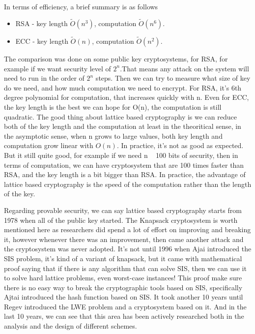 In terms of efficiency, a brief summary is as follows
\begin{itemize}
    \item RSA - key length $\tilde{O}(n^3)$, computation $\tilde{O}(n^6)$.
    \item ECC - key length $\tilde{O}(n)$, computation $\tilde{O}(n^2)$.

\end{itemize} The comparison was done on some public key cryptosystems, for RSA,
for example if we want security level of $2^n$.That means any attack on the
system will need to run in the order of $2^n$ steps.  Then we can try to measure
what size of key do we need, and how much computation we need to encrypt. For
RSA, it’s 6th degree polynomial for computation, that increases quickly with n.
Even for ECC, the key length is the best we can hope for O(n), the computation
is still quadratic.  The good thing about lattice based cryptography is we can
reduce both of the key length and the computation at least in the theoritical
sense, in the asymptotic sense, when n grows to large values, both key length
and computation grow linear with $O(n)$. In practice, it’s not as good as
expected.  But it still quite good, for example if we need n ~ 100 bits of
security, then in terms of computation, we can have cryptosystem that are 100
times faster than RSA, and  the key length is a bit bigger than RSA. In
practice, the advantage of lattice based cryptography is the speed of the
computation rather than the length of the key.

Regarding provable security, we can say lattice based cryptography starts from
1978 when all of the public key started. The Knapsack cryptosystem is worth
mentioned here as researchers did spend a lot of effort on improving and
breaking it, however whenever there was an improvement, then came another attack
and the cryptosystem was never adopted. It’s not until 1996 when Ajai introduced
the SIS problem, it’s kind of a variant of knapsack, but it came with
mathematical proof saying that if there is any algorithm that can solve SIS,
then we can use it to solve hard lattice problems, even worst-case instances!
This proof make sure there is no easy way to break the cryptographic tools based
on SIS, specifically Ajtai introduced the hash function based on SIS. It took
another 10 years until Regev introduced the LWE problem and a cryptosystem based
on it. And in the last 10 years, we can see that this area has been actively
researched both in the analysis and the design of different schemes.

